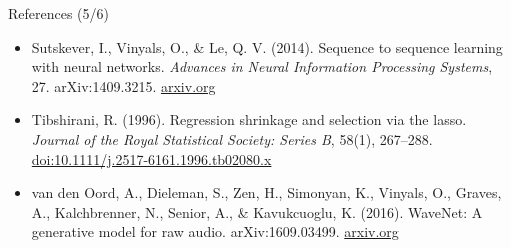 \begin{frame}{References (5/6)}
\begin{itemize}
    \item Sutskever, I., Vinyals, O., \& Le, Q. V. (2014). Sequence to sequence learning with neural networks. \textit{Advances in Neural Information Processing Systems}, 27. arXiv:1409.3215. \href{https://arxiv.org/abs/1409.3215}{arxiv.org}
    \item Tibshirani, R. (1996). Regression shrinkage and selection via the lasso. \textit{Journal of the Royal Statistical Society: Series B}, 58(1), 267--288. \href{https://doi.org/10.1111/j.2517-6161.1996.tb02080.x}{doi:10.1111/j.2517-6161.1996.tb02080.x}
    \item van den Oord, A., Dieleman, S., Zen, H., Simonyan, K., Vinyals, O., Graves, A., Kalchbrenner, N., Senior, A., \& Kavukcuoglu, K. (2016). WaveNet: A generative model for raw audio. arXiv:1609.03499. \href{https://arxiv.org/abs/1609.03499}{arxiv.org}
\end{itemize}
\end{frame}


